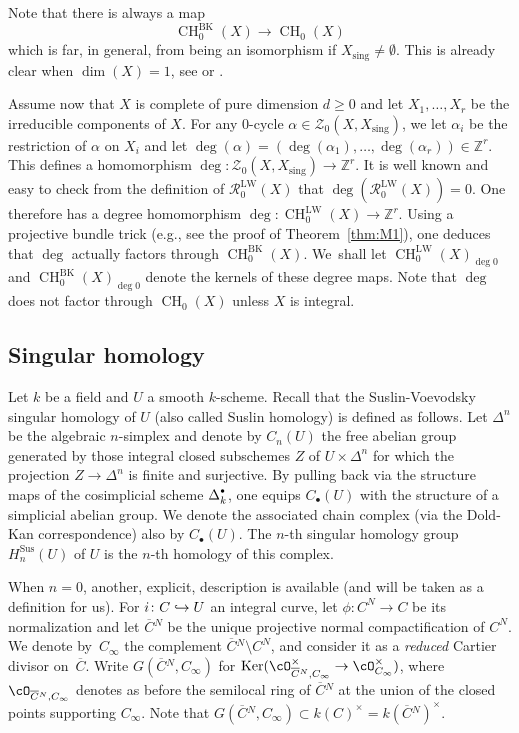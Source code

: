 \documentclass[JEP,XML,SOM,Unicode,published]{cedram}
\let\mathcal\mathscr
\def\hto{\mathrel{\lhook\joinrel\to}}
\let\inj\hto
\newcommand{\sbullet}{{\scriptscriptstyle\bullet}}
\newcommand{\csbullet}{{\raisebox{1pt}{$\sbullet$}}}
\newcommand{\BK}{\mathrm{BK}}
\newcommand{\LW}{\mathrm{LW}}
\newcommand{\sus}{\mathrm{Sus}}
\theoremstyle{definition}
\newcommand{\thmref}{Theorem~\ref}
\newcommand{\sR}{{\mathcal R}}
\newcommand{\sZ}{{\mathcal Z}}
\newcommand{\Z}{{\mathbb Z}}
\DeclareMathOperator{\CH}{CH}
\DeclareMathOperator{\Ker}{Ker}
\newcommand{\sing}{\mathrm{sing}}
\let\ov\overline
\let\ol\ov
\begin{document}
Note that there is always a map
\begin{equation}\label{eqn:lci-Fulton}
\CH^{\BK}_0(X) \to \CH_0(X)
\end{equation}
which is far, in general, from being an isomorphism if $X_{\sing} \neq
\emptyset$. This is already clear when $\dim (X)=1$, see \cite{LW} or
\cite[Lem.\,3.12]{BK}.

Assume now that $X$ is complete of pure dimension $d \ge 0$ and let
$X_1, \ldots, X_r$ be the irreducible components of $X$. For any
$0$-cycle $\alpha \in \sZ_0(X, X_\sing)$, we let
$\alpha_i$ be the restriction of $\alpha$ on $X_i$ and let
$\deg(\alpha) = (\deg(\alpha_1), \ldots , \deg(\alpha_r)) \in \Z^r$.
This defines a homomorphism
$\deg \colon \sZ_0(X, X_\sing) \to \Z^r$. It is well known and easy to check
from the definition of $\sR^{\LW}_0(X)$ that $\deg(\sR^{\LW}_0(X)) = 0$.
One therefore has a degree homomorphism
$\deg \colon \CH^{\LW}_0(X) \to \Z^r$. Using a projective bundle trick (e.g., see
the proof of \thmref{thm:M1}), one deduces that $\deg$ actually factors
through $\CH^{\BK}_0(X)$. We~shall let $\CH^{\LW}_0(X)_{\deg 0}$ and
$\CH^{\BK}_0(X)_{\deg 0}$ denote the kernels of these degree maps.
Note that $\deg$ does not factor through $\CH_0(X)$ unless $X$ is integral.

\subsection{Singular homology}\label{ssec:SuslinHomologydef}
Let $k$ be a field and $U$ a smooth $k$-scheme. Recall that the Suslin-Voevodsky singular homology of $U$ (also called Suslin homology) is defined as follows. Let $\Delta^n$ be the algebraic $n$-simplex and denote by $C_n(U)$ the free abelian group generated by those integral closed subschemes $Z$ of $U\times \Delta^n$ for which the projection $Z\to \Delta^n$ is finite and surjective. By pulling back via the structure maps of the cosimplicial scheme $\Delta^{\csbullet}_k$, one equips $C_\sbullet(U)$ with the structure of a simplicial abelian group. We denote the associated chain complex (via the Dold-Kan correspondence) also by $C_\sbullet(U)$. The $n$-th singular homology
group $H^{\sus}_n(U)$ of $U$ is the $n$-th homology of this complex.

When $n=0$, another, explicit, description is available (and will be taken as a definition for us). For $i\colon C\inj U$ an integral curve, let $\phi\colon C^N\to C$ be its normalization and let $\ol{C}{}^N$ be the unique projective normal
compactification of $C^N$. We denote by~$C_\infty$ the complement $\ol{C}{}^N \setminus C^N$, and consider it as a \emph{reduced} Cartier divisor on~$\ol{C}$. Write $G(\ol{C}{}^N, C_\infty)$ for $\Ker(\cO_{\ol{C}{}^N, C_\infty}^\times \to \cO_{C_\infty}^\times)$, where $\cO_{\ol{C}{}^N, C_\infty}$ denotes as before the semilocal ring of $\ol{C}{}^N$ at the union of the closed points supporting $C_\infty$. Note that $G(\ol{C}{}^N, C_\infty)\subset k(C)^\times = k(\ol{C}{}^N)^\times$.
\end{document}

